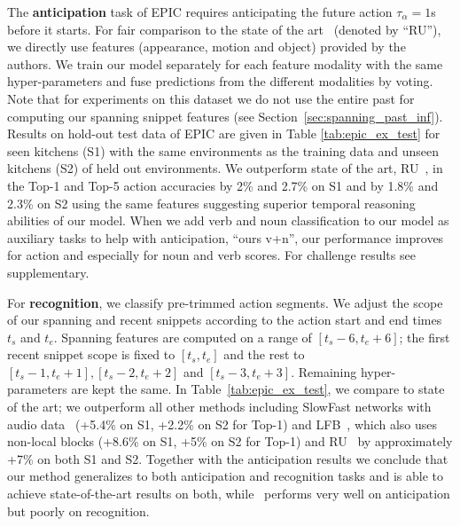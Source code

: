 \documentclass[runningheads]{llncs}
\begin{document}
The \textbf{anticipation} task of EPIC requires anticipating the future action $\tau_{\alpha}\!=\!1$s before it starts. For fair comparison to the state of the art~\cite{furnari2019rulstm} (denoted by ``RU''), 
we directly use features (appearance, motion and object) provided by the authors. We train our model separately for each feature modality with the same hyper-parameters and fuse predictions from the different modalities by voting. Note that for experiments on this dataset we do not use the entire past for computing our spanning snippet features (see Section~\ref{sec:spanning_past_inf}).  
Results on hold-out test data of EPIC are given in Table \ref{tab:epic_ex_test} for seen kitchens (S1) with the same environments as the training data and unseen kitchens (S2) of held out environments.
We outperform state of the art, RU~\cite{furnari2019rulstm}, in the Top-1 and Top-5 action accuracies by 2\% and 2.7\% on S1 and by 1.8\% and 2.3\% on S2 using the same features suggesting superior temporal reasoning abilities of our model. When we add verb and noun classification to our model as auxiliary tasks to help with anticipation, ``ours v+n'', our performance improves for action and especially for noun and verb scores.  For challenge results  see supplementary. 

For \textbf{recognition}, we classify pre-trimmed action segments. We adjust the scope of our spanning and recent snippets according to the action start and end times $t_s$ and $t_e$. Spanning  features are computed on a range of $[t_s - 6, t_e + 6]$; the first recent snippet scope is fixed to $[t_s,t_e]$ and the rest to $[t_s-1,t_e+1], [t_s-2,t_e+2]$ and $[t_s-3,t_e+3]$. Remaining hyper-parameters are kept the same. In Table~\ref{tab:epic_ex_test}, we compare to state of the art; we outperform all other  methods including SlowFast networks with audio data~\cite{xiao2020audiovisual} (+5.4\% on S1, +2.2\% on S2 for Top-1) and LFB~\cite{lfb2019}, which also uses non-local blocks (+8.6\% on S1, +5\% on S2 for Top-1) and RU~\cite{furnari2019rulstm} by approximately +7\% on both S1 and S2. Together with the anticipation results we conclude that our method generalizes to both anticipation and recognition tasks and is able to achieve state-of-the-art results on both, while~\cite{furnari2019rulstm} performs very well on anticipation but poorly on recognition.
\end{document}

